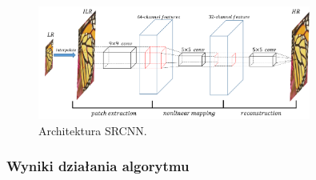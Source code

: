 \documentclass[a4paper,11pt, notitlepage ]{article}
\begin{document}
 	\begin{figure}[h!]
 	\centering
 	\includegraphics[width=0.8\textwidth]{SRCNN.png}
 	\caption{Architektura SRCNN.}
 	\end{figure}
 
 \newpage
	 \subsubsection{Wyniki działania algorytmu} 
\end{document}
